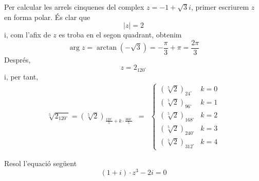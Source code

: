\begin{solucio}
Per calcular les arrels cinquenes del complex $z=-1+\sqrt{3}i$, primer
escriurem $z$ en forma polar. És clar que
\begin{equation*}
\left\vert z\right\vert =2
\end{equation*}
i, com l’afix de $z$ es troba en el segon quadrant, obtenim
\begin{equation*}
\arg z=\arctan (-\sqrt{3})=-\frac{\pi }{3}+\pi =\frac{2\pi }{3}
\end{equation*}
Després,
\begin{equation*}
z=2_{120
^{\circ}
}
\end{equation*}
i, per tant,
\begin{equation*}
\begin{array}{lll}
\sqrt[5]{2_{120
^{\circ}
}}=\left( \sqrt[5]{2}\right) _{\frac{120
^{\circ}
}{5}+k\cdot \frac{360
^{\circ}
}{5}} & = & \left\{
\begin{array}{ll}
\left( \sqrt[5]{2}\right) _{24
^{\circ}
} & k=0 \\
\left( \sqrt[5]{2}\right) _{96
^{\circ}
} & k=1 \\
\left( \sqrt[5]{2}\right) _{168
^{\circ}
} & k=2 \\
\left( \sqrt[5]{2}\right) _{240
^{\circ}
} & k=3 \\
\left( \sqrt[5]{2}\right) _{312
^{\circ}
} & k=4
\end{array}
\right.
\end{array}
\end{equation*}
\end{solucio}

\begin{exemple}
Resol l’equació següent
\begin{equation*}
(1+i)\cdot z^{3}-2i=0
\end{equation*}
\end{exemple}

